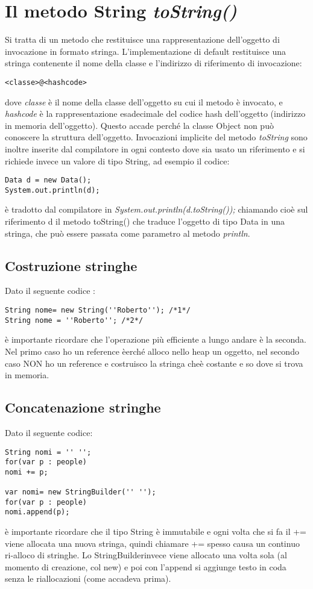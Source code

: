 \section{Il metodo String \textit{toString()}}
Si tratta di un metodo che restituisce una rappresentazione dell'oggetto di invocazione in formato stringa. L'implementazione di default restituisce una stringa contenente il nome della classe e l'indirizzo di riferimento di invocazione:
\begin{lstlisting}
<classe>@<hashcode>
\end{lstlisting}
dove \textit{classe} è il nome della classe dell'oggetto su cui il metodo è invocato, e \textit{hashcode} è la rappresentazione esadecimale del codice hash dell'oggetto (indirizzo in memoria dell'oggetto). Questo accade perché la classe Object non può conoscere la struttura dell'oggetto.
Invocazioni implicite del metodo \textit{toString} sono inoltre inserite dal compilatore in ogni contesto dove sia usato un riferimento e si richiede invece un valore di tipo String, ad esempio il codice:
\begin{lstlisting}
Data d = new Data();
System.out.println(d);
\end{lstlisting}
è tradotto dal compilatore in \textit{System.out.println(d.toString());} chiamando cioè sul riferimento d il metodo toString() che traduce l'oggetto di tipo Data in una stringa, che può essere passata come parametro al metodo \textit{println}.

\subsection{Costruzione stringhe}
Dato il seguente codice :
\begin{lstlisting}
String nome= new String(''Roberto''); /*1*/
String nome = ''Roberto''; /*2*/
\end{lstlisting}
è importante ricordare che l'operazione più efficiente a lungo andare è la seconda. Nel primo caso ho un reference èerché alloco nello heap un oggetto, nel secondo caso NON ho un reference e costruisco la stringa cheè costante e so dove si trova in memoria.

\subsection{Concatenazione stringhe}
Dato il seguente codice:
\begin{lstlisting}
String nomi = '' '';
for(var p : people)
nomi += p;

var nomi= new StringBuilder('' '');
for(var p : people)
nomi.append(p);
\end{lstlisting}
è importante ricordare che il tipo String è immutabile e ogni volta che si fa il += viene allocata una nuova stringa, quindi chiamare += spesso causa un continuo ri-alloco di stringhe. Lo StringBuilderinvece viene allocato una volta sola (al momento di creazione, col new) e poi con l'append si aggiunge testo in coda senza le riallocazioni (come accadeva prima).